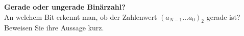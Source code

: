 \textbf{Gerade oder ungerade Binärzahl?}\\
An welchem Bit erkennt man, ob der Zahlenwert $(a_{N-1} \dots a_0)_2$ gerade ist? Beweisen Sie ihre Aussage kurz.